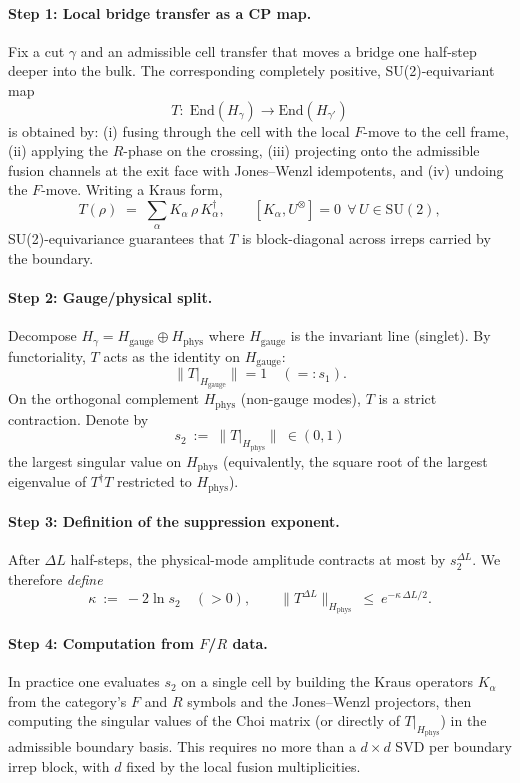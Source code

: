 \documentclass[11pt]{article}
\newcommand{\End}{\mathrm{End}}
\theoremstyle{plain}
\theoremstyle{definition}
\begin{document}
\paragraph{Step 1: Local bridge transfer as a CP map.}
Fix a cut $\gamma$ and an admissible cell transfer that moves a bridge one half-step deeper into the bulk. The corresponding completely positive, SU(2)-equivariant map
\[
  T: \; \End(H_\gamma) \to \End(H_{\gamma'})
\]
is obtained by: (i) fusing through the cell with the local $F$-move to the cell frame, (ii) applying the $R$-phase on the crossing, (iii) projecting onto the admissible fusion channels at the exit face with Jones--Wenzl idempotents, and (iv) undoing the $F$-move. Writing a Kraus form,
\[
  T(\rho)\;=\;\sum_{\alpha} K_\alpha \,\rho\, K_\alpha^\dagger,
  \qquad [K_\alpha, U^{\otimes}] = 0 \ \ \forall\,U\in \mathrm{SU}(2),
\]
SU(2)-equivariance guarantees that $T$ is block-diagonal across irreps carried by the boundary.

\paragraph{Step 2: Gauge/physical split.}
Decompose $H_\gamma = H_{\mathrm{gauge}} \oplus H_{\mathrm{phys}}$ where $H_{\mathrm{gauge}}$ is the invariant line (singlet). By functoriality, $T$ acts as the identity on $H_{\mathrm{gauge}}$:
\[
  \|T|_{H_{\mathrm{gauge}}}\| = 1 \quad (=:s_1).
\]
On the orthogonal complement $H_{\mathrm{phys}}$ (non-gauge modes), $T$ is a strict contraction. Denote by
\[
  s_2 \ :=\ \|T|_{H_{\mathrm{phys}}}\| \ \in (0,1)
\]
the largest singular value on $H_{\mathrm{phys}}$ (equivalently, the square root of the largest eigenvalue of $T^\dagger T$ restricted to $H_{\mathrm{phys}}$).

\paragraph{Step 3: Definition of the suppression exponent.}
After $\Delta L$ half-steps, the physical-mode amplitude contracts at most by $s_2^{\Delta L}$. We therefore \emph{define}
\begin{equation}
  \kappa \ :=\ -2\ln s_2 \quad (>0),
  \qquad
  \|T^{\Delta L}\|_{H_{\mathrm{phys}}} \ \le\ e^{-\kappa\,\Delta L/2}.
  \label{eq:kappa-definition}
\end{equation}

\paragraph{Step 4: Computation from $F$/$R$ data.}
In practice one evaluates $s_2$ on a single cell by building the Kraus operators $K_\alpha$ from the category's $F$ and $R$ symbols and the Jones--Wenzl projectors, then computing the singular values of the Choi matrix (or directly of $T|_{H_{\mathrm{phys}}}$) in the admissible boundary basis. This requires no more than a $d\times d$ SVD per boundary irrep block, with $d$ fixed by the local fusion multiplicities.
\end{document}
